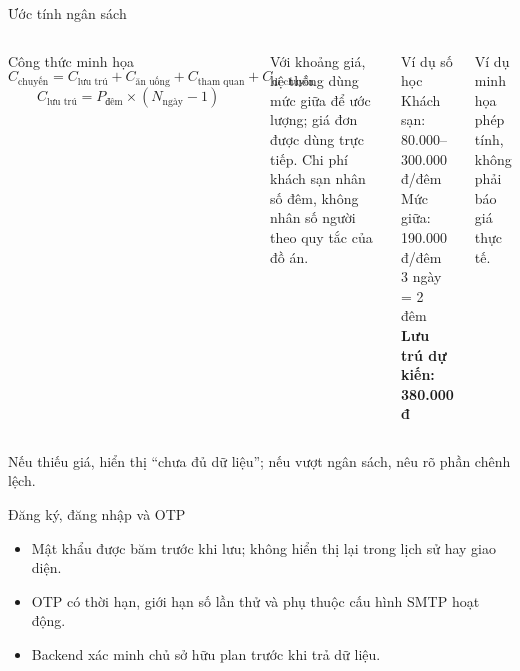 \documentclass[aspectratio=169,11pt]{beamer}
\begin{document}
\begin{frame}{Ước tính ngân sách}
  \begin{columns}[T,onlytextwidth]
      \begin{block}{Công thức minh họa}
        \[
        C_{\text{chuyến}} =
        C_{\text{lưu trú}}+
        C_{\text{ăn uống}}+
        C_{\text{tham quan}}+
        C_{\text{di chuyển}}
        \]
        \[
        C_{\text{lưu trú}} =
        P_{\text{đêm}}\times(N_{\text{ngày}}-1)
        \]
      \end{block}
      \small Với khoảng giá, hệ thống dùng mức giữa để ước lượng; giá đơn được dùng trực tiếp. Chi phí khách sạn nhân số đêm, không nhân số người theo quy tắc của đồ án.
      \begin{block}{Ví dụ số học}
        Khách sạn: 80.000--300.000 đ/đêm\\
        Mức giữa: 190.000 đ/đêm\\
        3 ngày = 2 đêm\\[2pt]
        \textbf{Lưu trú dự kiến: 380.000 đ}
      \end{block}
      \scriptsize Ví dụ minh họa phép tính, không phải báo giá thực tế.
  \end{columns}
  \vspace{0.1cm}
  \begin{center}\small
    Nếu thiếu giá, hiển thị “chưa đủ dữ liệu”; nếu vượt ngân sách, nêu rõ phần chênh lệch.
  \end{center}
\end{frame}

\begin{frame}{Đăng ký, đăng nhập và OTP}
  \centering
  \vspace{0.55cm}
  \begin{itemize}
    \item Mật khẩu được băm trước khi lưu; không hiển thị lại trong lịch sử hay giao diện.
    \item OTP có thời hạn, giới hạn số lần thử và phụ thuộc cấu hình SMTP hoạt động.
    \item Backend xác minh chủ sở hữu plan trước khi trả dữ liệu.
  \end{itemize}
\end{frame}
\end{document}
